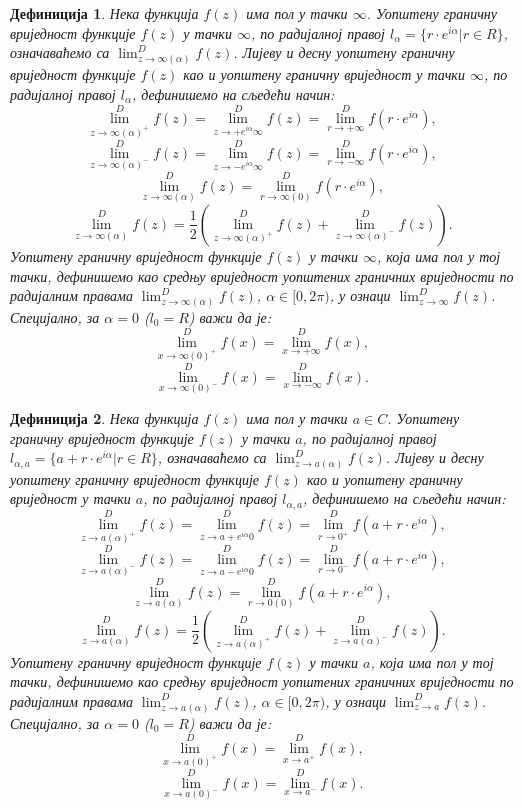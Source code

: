 \documentclass[12pt]{article}
\newtheorem{definition}{Дефиниција}
\begin{document}
\begin{definition}
Нека функција $f(z)$ има пол у тачки $\infty$. Уопштену граничну вриједност функције $f(z)$ у тачки $\infty$, по радијалној правој $l_\alpha=\{r\cdot e^{i\alpha}|r\in R\}$, означаваћемо са $\lim^D_{z\to\infty(\alpha)}f(z)$. Лијеву и десну уопштену граничну вриједност функције $f(z)$  као и уопштену граничну вриједност у тачки $\infty$, по радијалној правој $l_\alpha$, дефинишемо на сљедећи начин: $$\lim^D_{z\to\infty(\alpha)^+}f(z)=\lim^D_{z\to+e^{i\alpha}\infty}f(z)=\lim^D_{r\to+\infty}f(r\cdot e^{i\alpha}),$$ $$\lim^D_{z\to\infty(\alpha)^-}f(z)=\lim^D_{z\to-e^{i\alpha}\infty}f(z)=\lim^D_{r\to-\infty}f(r\cdot e^{i\alpha}),$$
$$\lim^D_{z\to\infty(\alpha)}f(z)=\lim^D_{r\to\infty(0)}f(r\cdot e^{i\alpha}),$$
$$\lim^D_{z\to\infty(\alpha)}f(z)=\frac{1}{2}(\lim^D_{z\to\infty(\alpha)^+}f(z)+\lim^D_{z\to\infty(\alpha)^-}f(z)).$$
Уопштену граничну вриједност функције $f(z)$ у тачки $\infty$, која има пол у тој тачки, дефинишемо као средњу вриједност уопштених граничних вриједности по радијалним правама $\lim^D_{z\to\infty(\alpha)}f(z)$, $\alpha\in[0,2\pi)$, у ознаци $\lim^D_{z\to\infty}f(z)$.\\
Специјално, за $\alpha=0$ ($l_0=R$) важи да је: $$\lim^D_{x\to\infty(0)^+}f(x)=\lim^D_{x\to+\infty}f(x),$$ $$\lim^D_{x\to\infty(0)^-}f(x)=\lim^D_{x\to-\infty}f(x).$$
\end{definition}

\begin{definition}
Нека функција $f(z)$ има пол у тачки $a\in C$. Уопштену граничну вриједност функције $f(z)$ у тачки $a$, по радијалној правој $l_{\alpha,a}=\{a+r\cdot e^{i\alpha}|r\in R\}$, означаваћемо са $\lim^D_{z\to a(\alpha)}f(z)$. Лијеву и десну уопштену граничну вриједност функције $f(z)$ као и уопштену граничну вриједност у тачки $a$, по радијалној правој $l_{\alpha,a}$, дефинишемо на сљедећи начин: $$\lim^D_{z\to a(\alpha)^+}f(z)=\lim^D_{z\to a+e^{i\alpha}0}f(z)=\lim^D_{r\to 0^+}f(a+r\cdot e^{i\alpha}),$$ $$\lim^D_{z\to a(\alpha)^-}f(z)=\lim^D_{z\to a-e^{i\alpha}0}f(z)=\lim^D_{r\to 0^-}f(a+r\cdot e^{i\alpha}),$$
 $$\lim^D_{z\to a(\alpha)}f(z)=\lim^D_{r\to 0(0)}f(a+r\cdot e^{i\alpha}),$$
 $$\lim^D_{z\to a(\alpha)}f(z)=\frac{1}{2}(\lim^D_{z\to a(\alpha)^+}f(z)+\lim^D_{z\to a(\alpha)^-}f(z)).$$
Уопштену граничну вриједност функције $f(z)$ у тачки $a$, која има пол у тој тачки, дефинишемо као средњу вриједност уопштених граничних вриједности по радијалним правама $\lim^D_{z\to a(\alpha)}f(z)$, $\alpha\in[0,2\pi)$, у ознаци $\lim^D_{z\to a}f(z)$.\\
Специјално, за $\alpha=0$ ($l_0=R$) важи да је: $$\lim^D_{x\to a(0)^+}f(x)=\lim^D_{x\to a^+}f(x),$$ $$\lim^D_{x\to a(0)^-}f(x)=\lim^D_{x\to a^-}f(x).$$
\end{definition}
\end{document}
